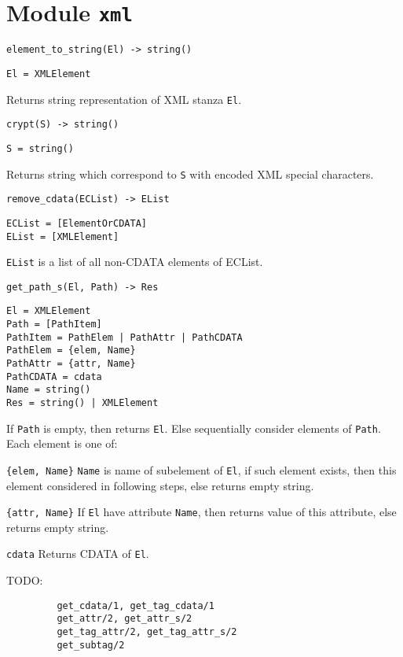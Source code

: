 \documentclass[a4paper,10pt]{article}
\begin{document}
\section{Module \texttt{xml}}
\label{sec:xmlmod}

\begin{description}
\item{\verb|element_to_string(El) -> string()|}
\begin{verbatim}
El = XMLElement
\end{verbatim}
  Returns string representation of XML stanza \texttt{El}.

\item{\verb|crypt(S) -> string()|}
\begin{verbatim}
S = string()
\end{verbatim}
  Returns string which correspond to \texttt{S} with encoded XML special
  characters.

\item{\verb|remove_cdata(ECList) -> EList|}
\begin{verbatim}
ECList = [ElementOrCDATA]
EList = [XMLElement]
\end{verbatim}
  \texttt{EList} is a list of all non-CDATA elements of ECList.



\item{\verb|get_path_s(El, Path) -> Res|}
\begin{verbatim}
El = XMLElement
Path = [PathItem]
PathItem = PathElem | PathAttr | PathCDATA
PathElem = {elem, Name}
PathAttr = {attr, Name}
PathCDATA = cdata
Name = string()
Res = string() | XMLElement
\end{verbatim}
  If \texttt{Path} is empty, then returns \texttt{El}.  Else sequentially
  consider elements of \texttt{Path}.  Each element is one of:
  \begin{description}
  \item{\verb|{elem, Name}|} \texttt{Name} is name of subelement of
    \texttt{El}, if such element exists, then this element considered in
    following steps, else returns empty string.
  \item{\verb|{attr, Name}|} If \texttt{El} have attribute \texttt{Name}, then
    returns value of this attribute, else returns empty string.
  \item{\verb|cdata|} Returns CDATA of \texttt{El}.
  \end{description}

\item{TODO:}
\begin{verbatim}
         get_cdata/1, get_tag_cdata/1
         get_attr/2, get_attr_s/2
         get_tag_attr/2, get_tag_attr_s/2
         get_subtag/2
\end{verbatim}
\end{description}
\end{document}
